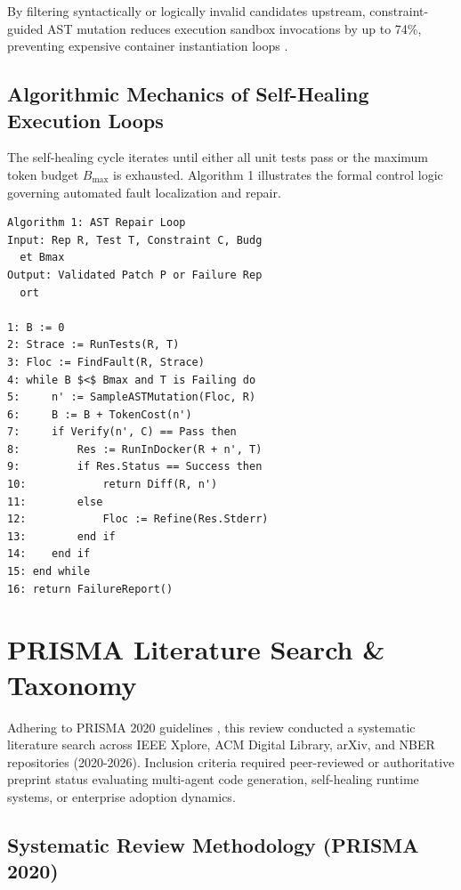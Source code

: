 \documentclass[10pt,journal,compsoc,twocolumn]{IEEEtran}
\begin{document}
By filtering syntactically or logically invalid candidates upstream, constraint-guided AST mutation reduces execution sandbox invocations by up to 74\%, preventing expensive container instantiation loops \cite{feuerriegel2023generativeai}.


\subsection{Algorithmic Mechanics of Self-Healing Execution Loops}

The self-healing cycle iterates until either all unit tests pass or the maximum token budget $B_{\text{max}}$ is exhausted. Algorithm 1 illustrates the formal control logic governing automated fault localization and repair.


\begin{scriptsize}
\begin{verbatim}
Algorithm 1: AST Repair Loop
Input: Rep R, Test T, Constraint C, Budg
  et Bmax
Output: Validated Patch P or Failure Rep
  ort

1: B := 0
2: Strace := RunTests(R, T)
3: Floc := FindFault(R, Strace)
4: while B $<$ Bmax and T is Failing do
5:     n' := SampleASTMutation(Floc, R)
6:     B := B + TokenCost(n')
7:     if Verify(n', C) == Pass then
8:         Res := RunInDocker(R + n', T)
9:         if Res.Status == Success then
10:            return Diff(R, n')
11:        else
12:            Floc := Refine(Res.Stderr)
13:        end if
14:    end if
15: end while
16: return FailureReport()
\end{verbatim}
\end{scriptsize}





\section{PRISMA Literature Search \& Taxonomy}


Adhering to PRISMA 2020 guidelines \cite{prisma2020}, this review conducted a systematic literature search across IEEE Xplore, ACM Digital Library, arXiv, and NBER repositories (2020-2026). Inclusion criteria required peer-reviewed or authoritative preprint status evaluating multi-agent code generation, self-healing runtime systems, or enterprise adoption dynamics.


\subsection{Systematic Review Methodology (PRISMA 2020)}
\end{document}
